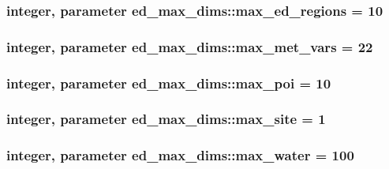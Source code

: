 \subsubsection[{\texorpdfstring{max\+\_\+ed\+\_\+regions}{max_ed_regions}}]{\setlength{\rightskip}{0pt plus 5cm}integer, parameter ed\+\_\+max\+\_\+dims\+::max\+\_\+ed\+\_\+regions = 10}\hypertarget{namespaceed__max__dims_a046576e3650edec35f14647030a0ad7e}{}\label{namespaceed__max__dims_a046576e3650edec35f14647030a0ad7e}
\subsubsection[{\texorpdfstring{max\+\_\+met\+\_\+vars}{max_met_vars}}]{\setlength{\rightskip}{0pt plus 5cm}integer, parameter ed\+\_\+max\+\_\+dims\+::max\+\_\+met\+\_\+vars = 22}\hypertarget{namespaceed__max__dims_ad51de8cc1effd1c544a3987c0a6f4390}{}\label{namespaceed__max__dims_ad51de8cc1effd1c544a3987c0a6f4390}
\subsubsection[{\texorpdfstring{max\+\_\+poi}{max_poi}}]{\setlength{\rightskip}{0pt plus 5cm}integer, parameter ed\+\_\+max\+\_\+dims\+::max\+\_\+poi = 10}\hypertarget{namespaceed__max__dims_a4a66ae8729df41bb66a806d56f685ada}{}\label{namespaceed__max__dims_a4a66ae8729df41bb66a806d56f685ada}
\subsubsection[{\texorpdfstring{max\+\_\+site}{max_site}}]{\setlength{\rightskip}{0pt plus 5cm}integer, parameter ed\+\_\+max\+\_\+dims\+::max\+\_\+site = 1}\hypertarget{namespaceed__max__dims_a4f9df14847da037dc8ff6f9c85086a62}{}\label{namespaceed__max__dims_a4f9df14847da037dc8ff6f9c85086a62}
\subsubsection[{\texorpdfstring{max\+\_\+water}{max_water}}]{\setlength{\rightskip}{0pt plus 5cm}integer, parameter ed\+\_\+max\+\_\+dims\+::max\+\_\+water = 100}\hypertarget{namespaceed__max__dims_a840d831a08084a2e9f939e28ef803b9a}{}\label{namespaceed__max__dims_a840d831a08084a2e9f939e28ef803b9a}
